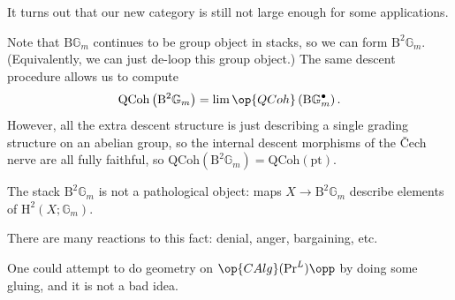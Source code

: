 \documentclass[../notes.tex]{subfiles}
\begin{document}
It turns out that our new category is still not large enough for some applications.
\begin{example}
	Note that $\mathrm B\mathbb G_m$ continues to be group object in stacks, so we can form $\mathrm B^2\mathbb G_m$. (Equivalently, we can just de-loop this group object.) The same descent procedure allows us to compute
	\[\mathrm{QCoh}\left(\mathrm B^2\mathbb G_m\right)=\lim\op{QCoh}\left(\mathrm B\mathbb G_m^\bullet\right).\]
	However, all the extra descent structure is just describing a single grading structure on an abelian group, so the internal descent morphisms of the \v{C}ech nerve are all fully faithful, so $\mathrm{QCoh}\left(\mathrm B^2\mathbb G_m\right)=\mathrm{QCoh}(\mathrm{pt})$.
\end{example}
\begin{remark}
	The stack $\mathrm B^2\mathbb G_m$ is not a pathological object: maps $X\to\mathrm B^2\mathbb G_m$ describe elements of $\mathrm H^2(X;\mathbb G_m)$.
\end{remark}
\begin{remark}[Schlank]
	There are many reactions to this fact: denial, anger, bargaining, etc.
\end{remark}
One could attempt to do geometry on $\op{CAlg}(\mathrm{Pr}^L)\opp$ by doing some gluing, and it is not a bad idea.
\end{document}
